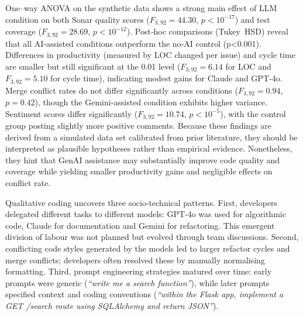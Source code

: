 \documentclass[conference]{IEEEtran}
\begin{document}
One–way ANOVA on the synthetic data shows a strong main effect of LLM condition on both Sonar quality scores ($F_{3,92}=44.30$, $p<10^{-17}$) and test coverage ($F_{3,92}=28.69$, $p<10^{-12}$).  Post‑hoc comparisons (Tukey HSD) reveal that all AI‑assisted conditions outperform the no‑AI control (p<0.001).  Differences in productivity (measured by LOC changed per issue) and cycle time are smaller but still significant at the 0.01 level ($F_{3,92}=6.14$ for LOC and $F_{3,92}=5.10$ for cycle time), indicating modest gains for Claude and GPT‑4o.  Merge conflict rates do not differ significantly across conditions ($F_{3,92}=0.94$, $p=0.42$), though the Gemini‑assisted condition exhibits higher variance.  Sentiment scores differ significantly ($F_{3,92}=10.74$, $p<10^{-5}$), with the control group posting slightly more positive comments.  Because these findings are derived from a simulated data set calibrated from prior literature, they should be interpreted as plausible hypotheses rather than empirical evidence.  Nonetheless, they hint that GenAI assistance may substantially improve code quality and coverage while yielding smaller productivity gains and negligible effects on conflict rate.

Qualitative coding uncovers three socio‑technical patterns.  First, developers delegated different tasks to different models: GPT‑4o was used for algorithmic code, Claude for documentation and Gemini for refactoring.  This emergent division of labour was not planned but evolved through team discussions.  Second, conflicting code styles generated by the models led to larger refactor cycles and merge conflicts; developers often resolved these by manually normalising formatting.  Third, prompt engineering strategies matured over time: early prompts were generic (\emph{“write me a search function”}), while later prompts specified context and coding conventions (\emph{“within the Flask app, implement a GET /search route using SQLAlchemy and return JSON”}).
\end{document}
